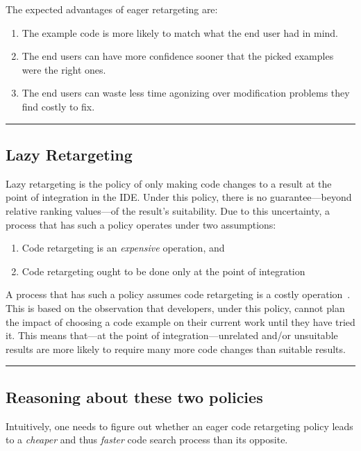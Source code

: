 The expected advantages of eager retargeting are:

\begin{enumerate}
	\item The example code is more likely to match what the end user had in mind.
	\item The end users can have more confidence sooner that the picked examples were the right ones.
	\item The end users can waste less time agonizing over modification problems they find costly to fix. 
\end{enumerate}


\fancybreak{\pfbreakdisplay}

\subsection{Lazy Retargeting}

Lazy retargeting is the policy of only making code changes to a result at the point of integration in the IDE. Under this policy, there is no guarantee---beyond relative ranking values---of the result's suitability. Due to this uncertainty, a process that has such a policy operates under two assumptions:

\begin{enumerate}
	\item Code retargeting is an \emph{expensive} operation, and
	\item Code retargeting ought to be done only at the point of integration
\end{enumerate}

A process that has such a policy assumes code retargeting is a costly operation~\cite{Brandt:2009ew, Wightman:2012gc}. This is based on the observation that developers, under this policy, cannot plan the impact of choosing a code example on their current work until they have tried it. This means that---at the point of integration---unrelated and/or unsuitable results are more likely to require many more code changes than suitable results.

\fancybreak{\pfbreakdisplay}

\subsection{Reasoning about these two policies}

Intuitively, one needs to figure out whether an eager code retargeting policy leads to a \emph{cheaper} and thus \emph{faster} code search process than its opposite. 

